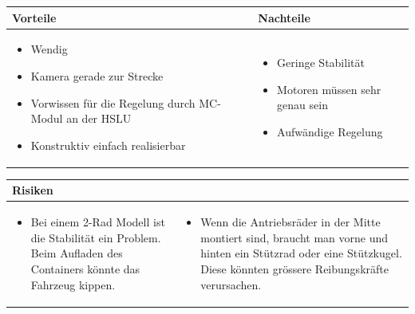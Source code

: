 \begin{table}[h]
\begin{tabular}{p{} | p{}}


 \textbf{Vorteile} & \textbf{Nachteile} \\ \hline
	 
\begin{itemize}
\item Wendig
\item Kamera gerade zur Strecke
\item Vorwissen für die Regelung durch MC-Modul an der HSLU
\item Konstruktiv einfach realisierbar
\end{itemize}

 
 &
 
\begin{itemize}
\item Geringe Stabilität
\item Motoren müssen sehr genau sein
\item Aufwändige Regelung
\end{itemize}

\end{tabular}
\end{table}

\begin{table}[h]
\begin{tabular}{p{}p{}}


 \textbf{Risiken} & \\ \hline
	 
\begin{itemize}
\item Bei einem 2-Rad Modell ist die Stabilität ein Problem. Beim Aufladen des Containers könnte das Fahrzeug kippen.
\end{itemize}
&
\begin{itemize}
\item Wenn die Antriebsräder in der Mitte montiert sind, braucht man vorne und hinten ein Stützrad oder eine Stützkugel. Diese könnten grössere Reibungskräfte verursachen.
\end{itemize}


 
\end{tabular}
\end{table}

\pagebreak